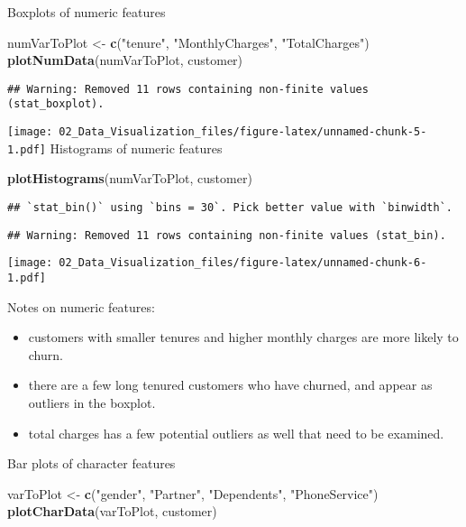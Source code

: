 \documentclass[]{article}
\newenvironment{Shaded}{\begin{snugshade}}{\end{snugshade}}
\newcommand{\KeywordTok}[1]{\textcolor[rgb]{0.13,0.29,0.53}{\textbf{#1}}}
\newcommand{\NormalTok}[1]{#1}
\newcommand{\StringTok}[1]{\textcolor[rgb]{0.31,0.60,0.02}{#1}}
\providecommand{\tightlist}{%
  \setlength{\itemsep}{0pt}\setlength{\parskip}{0pt}}
\begin{document}
Boxplots of numeric features

\begin{Shaded}
\begin{Highlighting}[]
\NormalTok{numVarToPlot <-}\StringTok{ }\KeywordTok{c}\NormalTok{(}\StringTok{"tenure"}\NormalTok{, }\StringTok{"MonthlyCharges"}\NormalTok{, }\StringTok{"TotalCharges"}\NormalTok{)}
\KeywordTok{plotNumData}\NormalTok{(numVarToPlot, customer)}
\end{Highlighting}
\end{Shaded}

\begin{verbatim}
## Warning: Removed 11 rows containing non-finite values (stat_boxplot).
\end{verbatim}

\texttt{[image: 02\_Data\_Visualization\_files/figure-latex/unnamed-chunk-5-1.pdf]}
Histograms of numeric features

\begin{Shaded}
\begin{Highlighting}[]
\KeywordTok{plotHistograms}\NormalTok{(numVarToPlot, customer)}
\end{Highlighting}
\end{Shaded}

\begin{verbatim}
## `stat_bin()` using `bins = 30`. Pick better value with `binwidth`.
\end{verbatim}

\begin{verbatim}
## Warning: Removed 11 rows containing non-finite values (stat_bin).
\end{verbatim}

\texttt{[image: 02\_Data\_Visualization\_files/figure-latex/unnamed-chunk-6-1.pdf]}

Notes on numeric features:

\begin{itemize}
\tightlist
\item
  customers with smaller tenures and higher monthly charges are more
  likely to churn.
\item
  there are a few long tenured customers who have churned, and appear as
  outliers in the boxplot.
\item
  total charges has a few potential outliers as well that need to be
  examined.
\end{itemize}

Bar plots of character features

\begin{Shaded}
\begin{Highlighting}[]
\NormalTok{varToPlot <-}\StringTok{ }\KeywordTok{c}\NormalTok{(}\StringTok{"gender"}\NormalTok{, }\StringTok{"Partner"}\NormalTok{, }\StringTok{"Dependents"}\NormalTok{, }\StringTok{"PhoneService"}\NormalTok{)}
\KeywordTok{plotCharData}\NormalTok{(varToPlot, customer)}
\end{Highlighting}
\end{Shaded}
\end{document}
